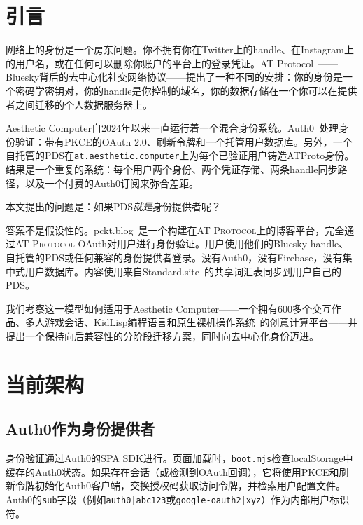 \documentclass[10pt,letterpaper,twocolumn]{article}
\newcommand{\atproto}{\textsc{AT Protocol}}
\begin{document}

\section{引言}

网络上的身份是一个房东问题。你不拥有你在Twitter上的handle、在Instagram上的用户名，或在任何可以删除你账户的平台上的登录凭证。AT Protocol~\citep{atproto2024spec}——Bluesky背后的去中心化社交网络协议——提出了一种不同的安排：你的身份是一个密码学密钥对，你的handle是你控制的域名，你的数据存储在一个你可以在提供者之间迁移的个人数据服务器上。

Aesthetic Computer自2024年以来一直运行着一个混合身份系统。Auth0~\citep{auth0spa}处理身份验证：带有PKCE的OAuth 2.0、刷新令牌和一个托管用户数据库。另外，一个自托管的PDS在\texttt{at.aesthetic.computer}上为每个已验证用户铸造ATProto身份。结果是一个重复的系统：每个用户两个身份、两个凭证存储、两条handle同步路径，以及一个付费的Auth0订阅来弥合差距。

本文提出的问题是：如果PDS\emph{就是}身份提供者呢？

答案不是假设性的。pckt.blog~\citep{pcktblog2025}是一个构建在\atproto{}上的博客平台，完全通过\atproto{} OAuth对用户进行身份验证。用户使用他们的Bluesky handle、自托管的PDS或任何兼容的身份提供者登录。没有Auth0，没有Firebase，没有集中式用户数据库。内容使用来自Standard.site~\citep{standardsite2025}的共享词汇表同步到用户自己的PDS。

我们考察这一模型如何适用于Aesthetic Computer——一个拥有600多个交互作品、多人游戏会话、KidLisp编程语言和原生裸机操作系统~\citep{scudder2026os}的创意计算平台——并提出一个保持向后兼容性的分阶段迁移方案，同时向去中心化身份迈进。


\section{当前架构}
\label{sec:current}

\subsection{Auth0作为身份提供者}

身份验证通过Auth0的SPA SDK进行。页面加载时，\texttt{boot.mjs}检查localStorage中缓存的Auth0状态。如果存在会话（或检测到OAuth回调），它将使用PKCE和刷新令牌初始化Auth0客户端，交换授权码获取访问令牌，并检索用户配置文件。Auth0的\texttt{sub}字段（例如\texttt{auth0|abc123}或\texttt{google-oauth2|xyz}）作为内部用户标识符。
\end{document}
